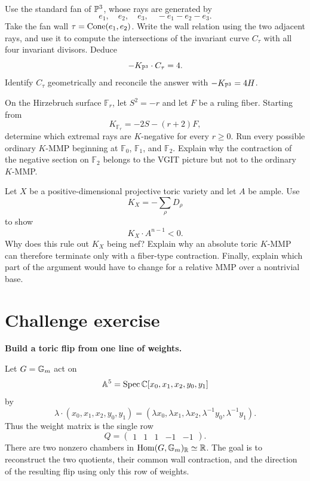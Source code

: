 \begin{exercises}
\item Use the standard fan of \(\mathbb{P}^3\), whose rays are generated by
\[
e_1,\quad e_2,\quad e_3,\quad-e_1-e_2-e_3.
\]
Take the fan wall \(\tau=\operatorname{Cone}(e_1,e_2)\).  Write the wall relation
using the two adjacent rays, and use it to compute the intersections
of the invariant curve \(C_\tau\) with all four invariant divisors.
Deduce
\[
-K_{\mathbb{P}^3}\cdot C_\tau=4.
\]
Identify \(C_\tau\) geometrically and reconcile the answer with
\(-K_{\mathbb{P}^3}=4H\).

\item On the Hirzebruch surface \(\mathbb F_r\), let \(S^2=-r\) and
let \(F\) be a ruling fiber.  Starting from
\[
K_{\mathbb F_r}=-2S-(r+2)F,
\]
determine which extremal rays are \(K\)-negative for every
\(r\geq0\).  Run every possible ordinary \(K\)-MMP beginning at
\(\mathbb F_0\), \(\mathbb F_1\), and \(\mathbb F_2\).  Explain why
the contraction of the negative section on \(\mathbb F_2\) belongs to
the VGIT picture but not to the ordinary \(K\)-MMP.

\item Let \(X\) be a positive-dimensional projective toric variety
and let \(A\) be ample.  Use
\[
K_X=-\sum_{\rho}D_\rho
\]
to show
\[
K_X\cdot A^{n-1}<0.
\]
Why does this rule out \(K_X\) being nef?  Explain why an absolute
toric \(K\)-MMP can therefore terminate only with a fiber-type
contraction.  Finally, explain which part of the argument would have
to change for a relative MMP over a nontrivial base.

\end{exercises}

\clearpage
\section*{Challenge exercise}

\noindent
\textbf{Build a toric flip from one line of weights.}

\medskip

Let \(G=\mathbb{G}_{m}\) act on
\[
\mathbb{A}^5=\operatorname{Spec}\mathbb{C}[x_0,x_1,x_2,y_0,y_1]
\]
by
\[
\lambda\cdot(x_0,x_1,x_2,y_0,y_1)
=
(\lambda x_0,\lambda x_1,\lambda x_2,
 \lambda^{-1}y_0,\lambda^{-1}y_1).
\]
Thus the weight matrix is the single row
\[
Q=\begin{pmatrix}1&1&1&-1&-1\end{pmatrix}.
\]
There are two nonzero chambers in
\(\operatorname{Hom}(G,\mathbb{G}_{m})_{\mathbb{R}}\simeq\mathbb{R}\).  The goal is to reconstruct the two
quotients, their common wall contraction, and the direction of the
resulting flip using only this row of weights.

